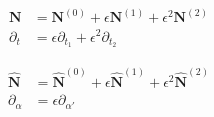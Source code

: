 \documentclass[]{article}
\begin{document}
\noindent\begin{minipage}{.5\linewidth}
  \begin{align*}
    \boldsymbol{N} &= \boldsymbol{N}^{(0)} + \epsilon \boldsymbol{N}^{(1)}+ \epsilon^2 \boldsymbol{N}^{(2)} \\
    \partial_t &= \epsilon\partial_{t_1} + \epsilon^2\partial_{t_2}
  \end{align*}
\end{minipage}
\noindent\begin{minipage}{.5\linewidth}
  \begin{align*}
      \boldsymbol{\hat{N}} &= \boldsymbol{\hat{N}}^{(0)} + \epsilon\boldsymbol{\hat{N}}^{(1)}+ \epsilon^2 \boldsymbol{\hat{N}}^{(2)} \\
      \partial_\alpha &= \epsilon\partial_{\alpha'}
  \end{align*}
\end{minipage}
\end{document}

